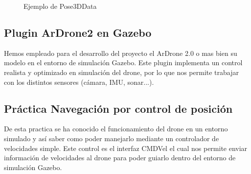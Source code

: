 \begin{figure}[H]
 \centering
 \caption{Ejemplo de Pose3DData}
 \label{f:Ejemplo de Pose3DData}
\end{figure} 

\subsection{Plugin ArDrone2 en Gazebo}
\hspace{1cm} Hemos empleado para el desarrollo del proyecto el ArDrone 2.0 o mas bien su modelo en el entorno de simulación Gazebo. Este plugin implementa un control realista y optimizado en simulación del drone, por lo que nos permite trabajar con los distintos sensores (cámara, IMU, sonar...).

\subsection{Práctica Navegación por control de posición}
\hspace{1cm} De esta practica se ha conocido el funcionamiento del drone en un entorno simulado y así saber como poder manejarlo mediante un controlador de velocidades simple. Este control es el interfaz CMDVel el cual nos permite enviar información de velocidades al drone para poder guiarlo dentro del entorno de simulación Gazebo. 

